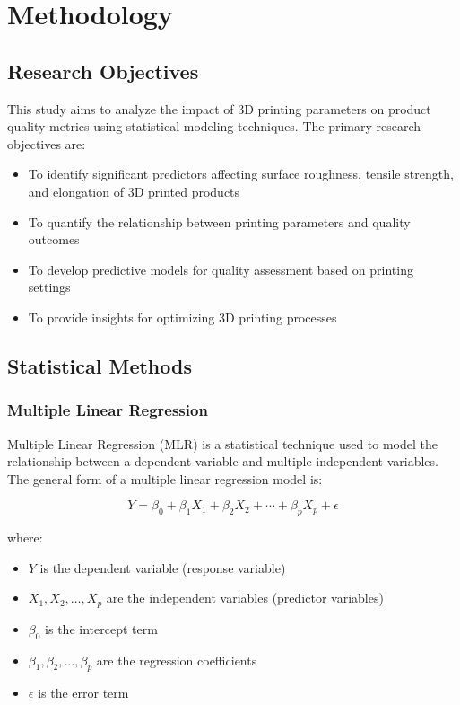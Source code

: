 
\section{Methodology}

\subsection{Research Objectives}

This study aims to analyze the impact of 3D printing parameters on product quality metrics using statistical modeling techniques. The primary research objectives are:

\begin{itemize}
    \item To identify significant predictors affecting surface roughness, tensile strength, and elongation of 3D printed products
    \item To quantify the relationship between printing parameters and quality outcomes
    \item To develop predictive models for quality assessment based on printing settings
    \item To provide insights for optimizing 3D printing processes
\end{itemize}

\subsection{Statistical Methods}

\subsubsection{Multiple Linear Regression}

Multiple Linear Regression (MLR) is a statistical technique used to model the relationship between a dependent variable and multiple independent variables. The general form of a multiple linear regression model is:

\begin{equation}
Y = \beta_0 + \beta_1 X_1 + \beta_2 X_2 + \cdots + \beta_p X_p + \epsilon
\end{equation}

where:
\begin{itemize}
    \item $Y$ is the dependent variable (response variable)
    \item $X_1, X_2, \ldots, X_p$ are the independent variables (predictor variables)
    \item $\beta_0$ is the intercept term
    \item $\beta_1, \beta_2, \ldots, \beta_p$ are the regression coefficients
    \item $\epsilon$ is the error term
\end{itemize}

